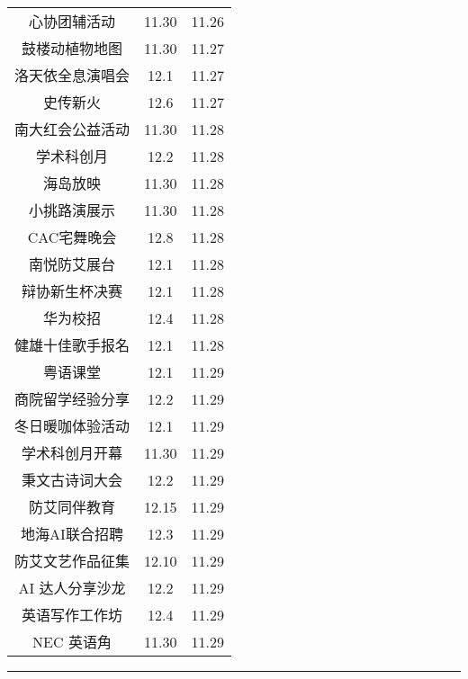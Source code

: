 \documentclass[letterpaper, 12pt]{article}
\begin{document}
\begin{multicols}{2}
{\begin{longtable}{|c|c|c|}
    心协团辅活动 & 11.30 & 11.26\\
    鼓楼动植物地图 & 11.30 & 11.27\\
    洛天依全息演唱会 & 12.1 & 11.27\\
    史传新火 & 12.6 & 11.27\\
    南大红会公益活动 & 11.30 & 11.28\\
    学术科创月 & 12.2 & 11.28\\
    海岛放映 & 11.30 & 11.28\\
    小挑路演展示 & 11.30 & 11.28\\
    CAC宅舞晚会 & 12.8 & 11.28\\
    南悦防艾展台 & 12.1 & 11.28\\
    辩协新生杯决赛 & 12.1 & 11.28\\
    华为校招 & 12.4 & 11.28\\
    健雄十佳歌手报名 & 12.1 & 11.28\\
    粤语课堂 & 12.1 & 11.29\\
    商院留学经验分享 & 12.2 & 11.29\\
    冬日暖咖体验活动 & 12.1 & 11.29\\
    学术科创月开幕 & 11.30 & 11.29\\
    秉文古诗词大会 & 12.2 & 11.29\\
    防艾同伴教育 & 12.15 & 11.29\\
    地海AI联合招聘 & 12.3 & 11.29\\
    防艾文艺作品征集 & 12.10 & 11.29\\
    AI 达人分享沙龙 & 12.2 & 11.29\\
    英语写作工作坊 & 12.4 & 11.29\\
    NEC 英语角 & 11.30 & 11.29\\
    
    \hline
\end{longtable}
\unskip
\unpenalty
\unpenalty}\unvbox\colbbox
\end{multicols}
\hrule
\pagebreak
\end{document}
